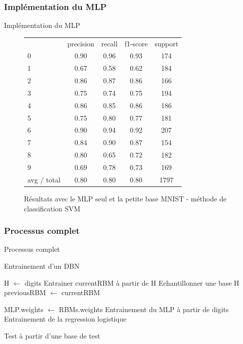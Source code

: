 \subsubsection*{Implémentation du MLP}

\begin{frame}{Implémentation du MLP}
	\begin{figure}[ht!]
	\centering
	\begin{tabular}{l|c|c|c|c}
						 &  precision  &  recall & f1-score  & support \\
						0 &      0.90 &     0.96 &     0.93&       174 \\
						1  &     0.67  &    0.58  &    0.62 &      184\\
						2   &    0.86   &   0.87   &   0.86  &     166\\
						3    &   0.75    &  0.74    &  0.75   &    194\\
						4     &  0.86     & 0.85     & 0.86    &   186\\
						5      & 0.75      &0.80      &0.77     &  181\\
						6 &      0.90&      0.94&      0.92      & 207\\
						7  &     0.84 &     0.90  &    0.87&       154\\
						8   &    0.80  &    0.65   &   0.72 &      182\\
						9    &   0.69   &   0.78    &  0.73  &     169\\
	avg / total     &  0.80    &  0.80     & 0.80   &   1797
	\end{tabular}
	\caption{Résultats avec le MLP seul et la petite base MNIST - méthode de classification SVM}
	\end{figure} 
\end{frame}

\subsubsection*{Processus complet}

\begin{frame}{Processus complet}
	\begin{algorithm}[H]
	\caption{Entrainement d'un DBN}
	\label{ProcessComplet}
		\begin{algorithmic}
			\State H $\gets$ digits
					\State Entrainer currentRBM à partir de H
						\State Echantillonner une base H
					\EndIf
				\State previousRBM $\gets$ currentRBM
			\EndFor
			
			\State MLP.weights $\gets$ RBMs.weights
			\State Entrainement du MLP à partir de digits
			\State Entrainement de la regression logistique
			
			\State Test à partir d'une base de test
		\end{algorithmic}
	\end{algorithm}
\end{frame}

